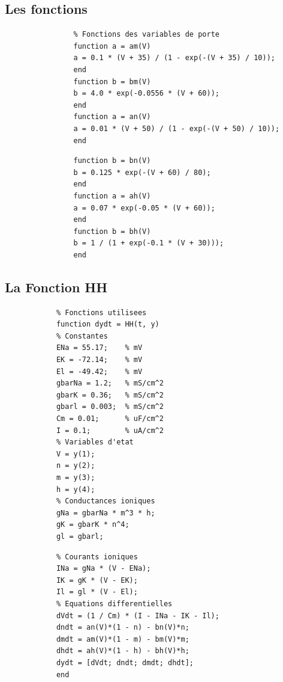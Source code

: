 \subsection{Les fonctions}
		\begin{center}
			\begin{minipage}{0.49\textwidth}
				\begin{lstlisting}
				% Fonctions des variables de porte 
				function a = am(V)
				a = 0.1 * (V + 35) / (1 - exp(-(V + 35) / 10));
				end
				function b = bm(V)
				b = 4.0 * exp(-0.0556 * (V + 60));
				end
				function a = an(V)
				a = 0.01 * (V + 50) / (1 - exp(-(V + 50) / 10));
				end
				\end{lstlisting}
			\end{minipage}%
			\hfill
			\begin{minipage}{0.49\textwidth}
				\begin{lstlisting}
				function b = bn(V)
				b = 0.125 * exp(-(V + 60) / 80);
				end
				function a = ah(V)
				a = 0.07 * exp(-0.05 * (V + 60));
				end
				function b = bh(V)
				b = 1 / (1 + exp(-0.1 * (V + 30)));
				end
				\end{lstlisting}
			\end{minipage}
		\end{center}
\subsection{La Fonction HH}
	\begin{center}
		\begin{minipage}{0.49\textwidth}
			\begin{lstlisting}
			% Fonctions utilisees
			function dydt = HH(t, y)
			% Constantes
			ENa = 55.17;    % mV
			EK = -72.14;    % mV
			El = -49.42;    % mV
			gbarNa = 1.2;   % mS/cm^2
			gbarK = 0.36;   % mS/cm^2
			gbarl = 0.003;  % mS/cm^2
			Cm = 0.01;      % uF/cm^2
			I = 0.1;        % uA/cm^2
			% Variables d'etat
			V = y(1);
			n = y(2);
			m = y(3);
			h = y(4);
			% Conductances ioniques
			gNa = gbarNa * m^3 * h;
			gK = gbarK * n^4;
			gl = gbarl;
			\end{lstlisting}
		\end{minipage}%
		\hfill
		\begin{minipage}{0.49\textwidth}
			\begin{lstlisting}
			% Courants ioniques
			INa = gNa * (V - ENa);
			IK = gK * (V - EK);
			Il = gl * (V - El);
			% Equations differentielles
			dVdt = (1 / Cm) * (I - INa - IK - Il);
			dndt = an(V)*(1 - n) - bn(V)*n;
			dmdt = am(V)*(1 - m) - bm(V)*m;
			dhdt = ah(V)*(1 - h) - bh(V)*h;
			dydt = [dVdt; dndt; dmdt; dhdt];
			end
			\end{lstlisting}
		\end{minipage}
	\end{center}
